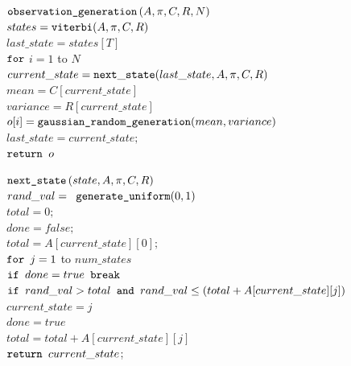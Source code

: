 \begin{algorithm}[h]
\begin{pseudocode}
\codename $\mbox{\texttt{observation\_generation}}\left(A,\pi,C,R,N \right)$\\
\codeline $states = \mbox{\texttt{viterbi}}(A,\pi,C,R)$\\
\codeline $last\_state = states[T]$\\
\codeline $\mbox{\texttt{for}} $ $i=1$ to  $N$  \\
\codeline \> $current\_state = {\tt next\_state}(last\_state,A,\pi,C,R)$\\
\codeline \> $mean = C[current\_state]$\\
\codeline \> $variance = R[current\_state]$\\
\codeline \> $o[i] =\mbox{\texttt{gaussian\_random\_generation}}(mean,variance)$\\
\codeline \> $last\_state = current\_state;$\\
\codeline $\mbox{\texttt{return }} o$
\end{pseudocode}
\end{algorithm}

\newpage

\begin{algorithm}[h]
\begin{pseudocode}
\codename $\mbox{\texttt{next\_state}}\left(state,A,\pi,C,R \right)$\\
\codeline $rand\_val = \mbox{\texttt{ generate\_uniform}}(0,1)$\\
\codeline $total = 0;$\\
\codeline $done = false;$\\
\codeline $total = A[current\_state][0];$\\
\codeline $\mbox{\texttt{for }} j = 1$ to $num\_states$\\
\codeline \> $\mbox{\texttt{if }} done = true \mbox{\texttt{ break}}$\\
\codeline \> $\mbox{\texttt{if }} rand\_val > total \mbox{\texttt{ and }} rand\_val \leq (total + A[current\_state][j])$\\
\codeline \> \> $current\_state = j$\\
\codeline \> \> $done = true$\\
\codeline \> $total = total+ A[current\_state][j]$\\
\codeline $\mbox{\texttt{return }} current\_state$;
\end{pseudocode}
\end{algorithm}



